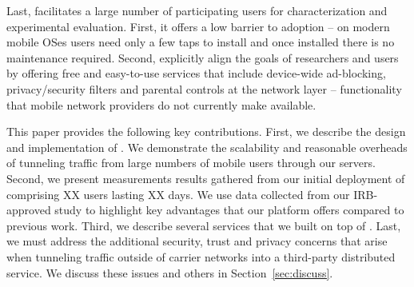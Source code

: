 Last, \meddle facilitates a large number of participating users for characterization
and experimental evaluation. First, it offers a low barrier to adoption -- 
on modern mobile OSes users need only a few taps to install \meddle and 
once installed there is no maintenance required. Second, \meddle explicitly align the goals of researchers 
and users by offering free and easy-to-use services that include device-wide
ad-blocking, privacy/security filters and parental controls at the
network layer -- functionality that mobile network providers do not
currently make available.

This paper provides the following key contributions. First, we describe the 
design and implementation of \meddle. We demonstrate the scalability and reasonable overheads of 
tunneling traffic from large numbers of mobile users through our servers. 
Second, we present measurements results gathered from our initial deployment of \meddle  
comprising XX users lasting XX days. We use data collected from 
our IRB-approved study to highlight key advantages that our platform 
offers compared to previous work. Third, we describe several 
services that we built on top of \meddle. Last, we must address the
additional security, trust and privacy concerns that arise when
tunneling traffic outside of carrier networks into a third-party
distributed service. We discuss these issues and others in
Section~\ref{sec:discuss}.



